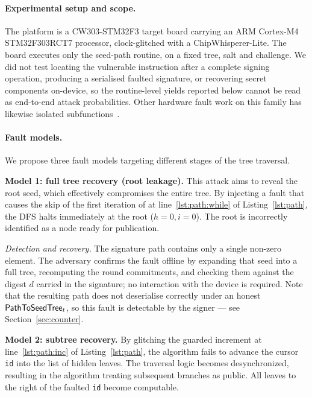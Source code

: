 \paragraph{Experimental setup and scope.}
The platform is a CW303-STM32F3 target board carrying an ARM Cortex-M4
STM32F303RCT7 processor, clock-glitched with a ChipWhisperer-Lite. The board
executes only the seed-path routine, on a fixed tree, salt and challenge. We
did not test locating the vulnerable instruction after a complete signing
operation, producing a serialised faulted signature, or recovering secret
components on-device, so the routine-level yields reported below cannot be read
as end-to-end attack probabilities. Other hardware fault work on this family
has likewise isolated subfunctions~\cite{BandaBK26}.

\paragraph{Fault models.}
We propose three fault models targeting different stages of the tree traversal.

\noindent\textbf{Model 1: full tree recovery (root leakage).}
This attack aims to reveal the root seed, which effectively compromises the entire tree. By injecting a fault that causes the skip of the first iteration of  at line~\ref{lst:path:while} of Listing~\ref{lst:path}, the DFS halts immediately at the root ($h=0, i=0$). The root is incorrectly identified as a node ready for publication.

\noindent\textit{Detection and recovery.} The signature path contains only a
single non-zero element. The adversary confirms the fault offline by expanding
that seed into a full tree, recomputing the round commitments, and checking
them against the digest $d$ carried in the signature; no interaction with the
device is required. Note that the resulting path does not deserialise
correctly under an honest $\mathsf{PathToSeedTree}_t$, so this fault is detectable by
the signer --- see Section~\ref{sec:counter}.

\noindent\textbf{Model 2: subtree recovery.}
By glitching the guarded increment  at line~\ref{lst:path:inc}
of Listing~\ref{lst:path}, the algorithm fails to advance the cursor
\texttt{id} into the list of hidden leaves. The traversal logic becomes desynchronized, resulting in the algorithm treating subsequent branches as public. All leaves to the right of the faulted \texttt{id} become computable.

